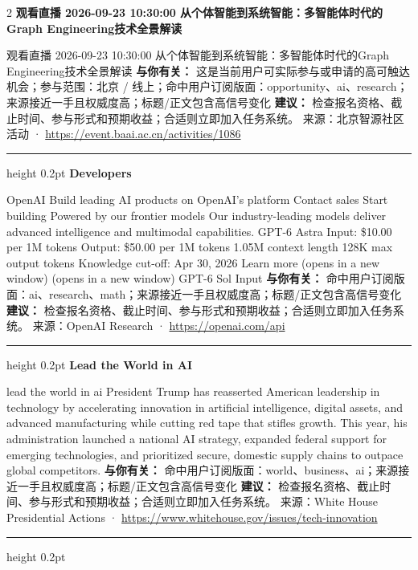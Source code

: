 \documentclass[10.5pt]{ctexart}
\begin{document}
\begin{multicols}{2}
{\large\bfseries 观看直播 2026-09-23 10:30:00 从个体智能到系统智能：多智能体时代的Graph Engineering技术全景解读}\par
观看直播 2026-09-23 10:30:00 从个体智能到系统智能：多智能体时代的Graph Engineering技术全景解读
\textbf{与你有关：} 这是当前用户可实际参与或申请的高可触达机会；参与范围：北京 / 线上；命中用户订阅版面：opportunity、ai、research；来源接近一手且权威度高；标题/正文包含高信号变化
\textbf{建议：} 检查报名资格、截止时间、参与形式和预期收益；合适则立即加入任务系统。
{\footnotesize\color{ormuted} 来源：北京智源社区活动 · \url{https://event.baai.ac.cn/activities/1086}}
\vspace{2mm}
\hrule height 0.2pt
\vspace{2mm}
{\large\bfseries Developers}\par
OpenAI Build leading AI products on OpenAI’s platform Contact sales Start building Powered by our frontier models Our industry-leading models deliver advanced intelligence and multimodal capabilities. GPT-6 Astra Input: \$10.00 per 1M tokens Output: \$50.00 per 1M tokens 1.05M context length 128K max output tokens Knowledge cut-off: Apr 30, 2026 Learn more (opens in a new window) (opens in a new window) GPT-6 Sol Input
\textbf{与你有关：} 命中用户订阅版面：ai、research、math；来源接近一手且权威度高；标题/正文包含高信号变化
\textbf{建议：} 检查报名资格、截止时间、参与形式和预期收益；合适则立即加入任务系统。
{\footnotesize\color{ormuted} 来源：OpenAI Research · \url{https://openai.com/api}}
\vspace{2mm}
\hrule height 0.2pt
\vspace{2mm}
{\large\bfseries Lead the World in AI}\par
lead the world in ai President Trump has reasserted American leadership in technology by accelerating innovation in artificial intelligence, digital assets, and advanced manufacturing while cutting red tape that stifles growth. This year, his administration launched a national AI strategy, expanded federal support for emerging technologies, and prioritized secure, domestic supply chains to outpace global competitors.
\textbf{与你有关：} 命中用户订阅版面：world、business、ai；来源接近一手且权威度高；标题/正文包含高信号变化
\textbf{建议：} 检查报名资格、截止时间、参与形式和预期收益；合适则立即加入任务系统。
{\footnotesize\color{ormuted} 来源：White House Presidential Actions · \url{https://www.whitehouse.gov/issues/tech-innovation}}
\vspace{2mm}
\hrule height 0.2pt

\end{multicols}
\end{document}
